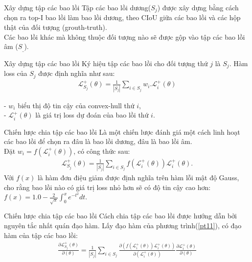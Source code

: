 \documentclass[11pt]{beamer}
\theoremstyle{definition}
\theoremstyle{plain}
\theoremstyle{plain}
\theoremstyle{remark}
\begin{document}
	\begin{frame}{Xây dựng tập các bao lồi}
		Tập các bao lồi dương($S_j$) được xây dựng bằng cách chọn ra $\text{top-I}$ bao lồi làm bao lồi dương, theo CIoU giữa các bao lồi và các hộp thật của đối tượng (grouth-truth).\\
		Các bao lồi khác mà không thuộc đối tượng nào sẽ được gộp vào tập các bao lồi âm ($S_{\_}$).
	\end{frame}
	\begin{frame}{Xây dựng tập các bao lồi}
		Ký hiệu tập các bao lồi cho đối tượng thứ $j$ là $S_j$. Hàm loss của $S_j$ được định 
		nghĩa như sau:
		\begin{align} \label{ptdd5}
			\mathcal{L}_{S_j}^+ (\theta) = \frac{1}{|S_j|} \sum_{i \in {S_j}} w_i .	\mathcal{L}_i^{+}(\theta) 
		\end{align}
		
		- $w_i$ biểu thị độ tin cậy của convex-hull thứ $i$, \\
		- $\mathcal{L}_i^+(\theta)$ là giá trị loss dự đoán của bao lồi thứ $i$.
		
	\end{frame}
	
	\begin{frame}{Chiến lược chia tập các bao lồi}
		Là một chiến lược đánh giá một cách linh hoạt các bao lồi để chọn ra đâu là bao lồi dương, đâu là bao lồi âm.\\
		Đặt $w_i = f\left(\mathcal{L}_{i}^{+}({\theta})\right)$, có công thức sau: 
		\begin{align} \label{pt11}
			\mathcal{L}_{S_j}^+ (\theta) = \frac{1}{|S_j|} \sum_{i \in {S_j}} f(\mathcal{L}_i^+(\theta)) \mathcal{L}_i^{+}(\theta).
		\end{align}
		Với $f(x)$ là hàm đơn điệu giảm được định nghĩa trên hàm lỗi mật độ Gauss, cho rằng bao lồi nào có giá trị loss nhỏ hơn sẽ có độ tin cậy cao hơn: $f(x)=1.0-\frac{2}{\sqrt{\pi}} \int_0^x e^{-t^2} d t$.
		
		
	\end{frame}
	
	\begin{frame}{Chiến lược chia tập các bao lồi}
		Cách chia tập các bao lồi được hướng dẫn bởi nguyên tắc nhất quán đạo hàm. Lấy đạo hàm của phương trình(\ref{pt11}), có đạo hàm của tập các bao lồi:
		\begin{align} \label{ptdd7}
			\frac{\partial\mathcal{L}_{S_j}^+ (\theta)}{\partial (\theta)} = \frac{1}{|S_j|} \sum_{i \in {S_j}} \frac{\partial (f(\mathcal{L}_i^+(\theta))\mathcal{L}_i^{+}(\theta))}{\partial (\mathcal{L}_i^+(\theta))} \frac{\partial \mathcal{L}_i^+ (\theta)}{\partial (\theta)}
		\end{align}
		
	\end{frame}
	
\end{document}
